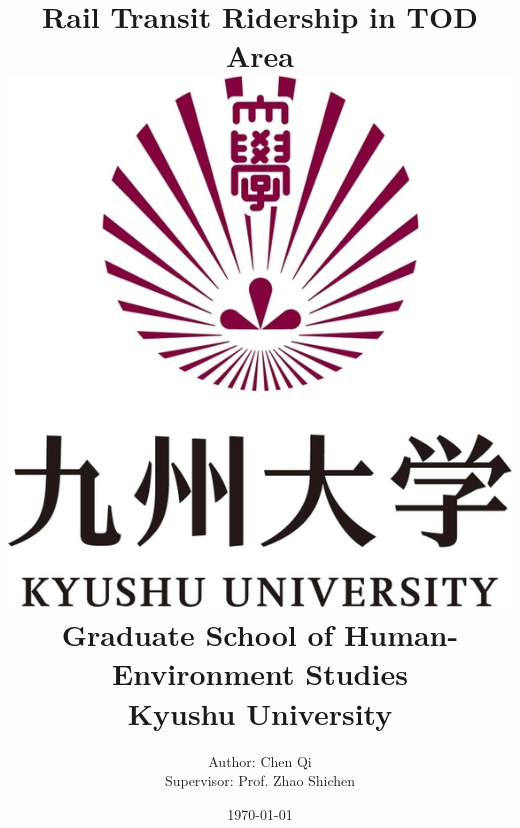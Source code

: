 \documentclass[12pt, twoside, a4paper]{book} %
\begin{document}
\title{
	{Rail Transit Ridership in TOD Area}\\
	{\vspace{3cm}}
	{\includegraphics[scale=0.2]{university.jpg}}\\
	{\vspace{2cm}}
	{\large Graduate School of Human-Environment Studies}\\
	{\large Kyushu University}
}
\author{
	{Author: Chen Qi}\\
	{Supervisor: Prof. Zhao Shichen}
	{\vspace{1cm}}
}
\date{\today}
\maketitle

\fontsize{14pt}{14pt} %
\selectfont

\tableofcontents %
\listoffigures %
\listoftables %

\frontmatter
\end{document}
